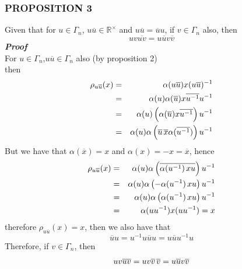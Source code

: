 \documentclass[12pt,onecolumn,letterpaper]{article} %
\begin{document}
 \subsubsection{PROPOSITION 3}\label{prop3}
 Given that for $u\in \Gamma_n$, $u\overline{u}\in \mathbb{R}^{\times}$ and $u\overline{u}=\overline{u}u$, if $v\in\Gamma_n$ also, then
 $$uv\overline{uv}=u\overline{u}v\overline{v}$$
 \textbf{\emph{Proof}}\\ 
 For $u\in\Gamma_n$,$u\overline{u}\in \Gamma_n$ also (by proposition 2)\\
 then
 \begin{eqnarray*}
    \rho_{u\overline{u}}(x)&=&\alpha(u\overline{u})x(u\overline{u})^{-1}\\
     &=&\alpha(u)\alpha(\overline{u})x\overline{u^{-1}}u^{-1}\\
   &=& \alpha(u)\left(\alpha(\overline{u})x\overline{u^{-1}}\right)u^{-1}\\
   &=&\alpha(u)\alpha\left(\overline{u}\hspace{.05cm}\overline{x}\alpha(\overline{u^{-1}})\right)u^{-1}
\end{eqnarray*}
But we have that $\alpha(\overline{x})=x$ and $\alpha(x)=-x=\overline{x}$, hence
 \begin{eqnarray*}
    \rho_{u\overline{u}}(x)&=&\alpha(u)\alpha\left(\overline{\alpha(u^{-1})\hspace{.05cm}xu}\right)u^{-1}\\
     &=&\alpha(u)\alpha\left(-\alpha(u^{-1})\hspace{.05cm}xu\right)u^{-1}\\
   &=& \alpha(u)\alpha\left(\alpha(u^{-1})\hspace{.05cm}xu\right)u^{-1}\\
   &=&\alpha(uu^{-1})x(uu^{-1})=x
\end{eqnarray*}
therefore $\rho_{u\overline{u}}(x)=x$, then we also have that
$$\overline{u}u=u^{-1}u\overline{u}u=u\overline{u}u^{-1}u$$
Therefore, if $v\in\Gamma_n$, then
 $$uv\overline{uv}=uv\overline{v}\hspace{0.05cm}\overline{v}=u\overline{u}v\overline{v}$$
\end{document}
